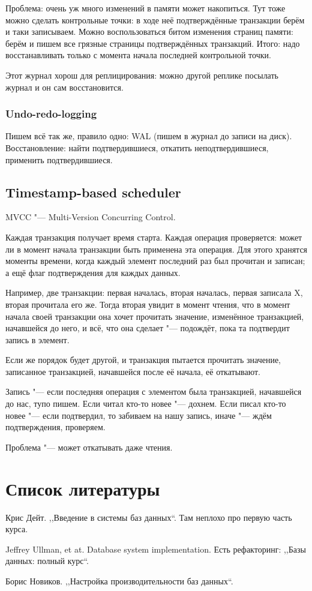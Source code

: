 Проблема: очень уж много изменений в памяти может накопиться.
Тут тоже можно сделать контрольные точки: в ходе неё подтверждённые транзакции берём и таки записываем.
Можно воспользоваться битом изменения страниц памяти: берём и пишем все грязные страницы подтверждённых транзакций.
Итого: надо восстанавливать только с момента начала последней контрольной точки.

Этот журнал хорош для реплицирования: можно другой реплике посылать журнал и он сам восстановится.

\subsection{Undo-redo-logging}
Пишем всё так же, правило одно: WAL (пишем в журнал до записи на диск).
Восстановление: найти подтвердившиеся, откатить неподтвердившиеся, применить подтвердившиеся.

\section{Timestamp-based scheduler}
MVCC "--- Multi-Version Concurring Control.

Каждая транзакция получает время старта.
Каждая операция проверяется: может ли в момент начала транзакции быть применена эта операция.
Для этого хранятся моменты времени, когда каждый элемент последний раз был прочитан и записан; а ещё флаг подтверждения для каждых данных.

Например, две транзакции: первая началась, вторая началась, первая записала X, вторая прочитала его же.
Тогда вторая увидит в момент чтения, что в момент начала своей транзакции она хочет прочитать значение, изменённое транзакцией, начавшейся до него, и всё, что она сделает "--- подождёт, пока та подтвердит запись в элемент.

Если же порядок будет другой, и транзакция пытается прочитать значение, записанное транзакцией, начавшейся после её начала, её откатывают.

Запись "--- если последняя операция с элементом была транзакцией, начавшейся до нас, тупо пишем.
Если читал кто-то новее "--- дохнем.
Если писал кто-то новее "--- если подтвердил, то забиваем на нашу запись, иначе "--- ждём подтверждения, проверяем.

Проблема "--- может откатывать даже чтения.

\chapter{Список литературы}

Крис Дейт. ,,Введение в системы баз данных``.
Там неплохо про первую часть курса.

Jeffrey Ullman, et at. Database system implementation.
Есть рефакторинг: ,,Базы данных: полный курс``.

Борис Новиков. ,,Настройка производительности баз данных``.
